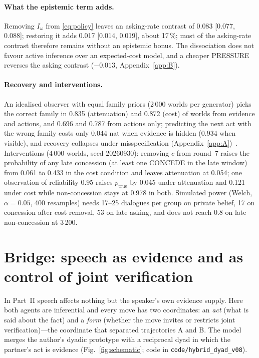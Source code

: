 \documentclass[runningheads]{llncs}
\newcommand{\Iw}{I_{\omega}}
\newcommand{\Etrue}{p_{\mathrm{true}}}
\begin{document}
\paragraph{What the epistemic term adds.} Removing $\Iw$ from \eqref{eq:policy} leaves an asking-rate contrast of 0.083 [0.077, 0.088]; restoring it adds 0.017 [0.014, 0.019], about 17\,\%; most of the asking-rate contrast therefore remains without an epistemic bonus. The dissociation does not favour active inference over an expected-cost model, and a cheaper PRESSURE reverses the asking contrast ($-0.013$, Appendix~\ref{app:B}).

\paragraph{Recovery and interventions.} An idealised observer with equal family priors (2\,000 worlds per generator) picks the correct family in 0.835 (attenuation) and 0.872 (cost) of worlds from evidence and actions, and 0.696 and 0.787 from actions only; predicting the next act with the wrong family costs only 0.044 nat when evidence is hidden (0.934 when visible), and recovery collapses under misspecification (Appendix~\ref{app:A})~\cite{wilson2019ten}. Interventions (4\,000 worlds, seed 20260930): removing $c$ from round~7 raises the probability of any late concession (at least one CONCEDE in the late window) from 0.061 to 0.433 in the cost condition and leaves attenuation at 0.054; one observation of reliability 0.95 raises $\Etrue$ by 0.045 under attenuation and 0.121 under cost while non-concession stays at 0.978 in both. Simulated power (Welch, $\alpha=0.05$, 400 resamples) needs 17--25 dialogues per group on private belief, 17 on concession after cost removal, 53 on late asking, and does not reach 0.8 on late non-concession at 3\,200.

\section{Bridge: speech as evidence and as control of joint verification}
\label{sec:bridge}
In Part~II speech affects nothing but the speaker's own evidence supply. Here both agents are inferential and every move has two coordinates: an \emph{act} (what is said about the fact) and a \emph{form} (whether the move invites or restricts joint verification)---the coordinate that separated trajectories A and B. The model merges the author's dyadic prototype with a reciprocal dyad in which the partner's act is evidence (Fig.~\ref{fig:schematic}; code in \texttt{code/hybrid\_dyad\_v08}).
\end{document}
